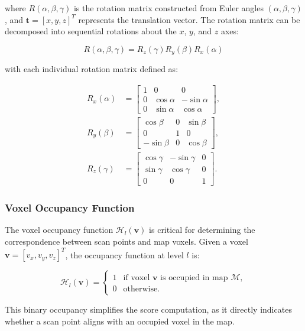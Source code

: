 where $R(\alpha, \beta, \gamma)$ is the rotation matrix constructed from Euler angles $(\alpha, \beta, \gamma)$, and $\mathbf{t} = [x, y, z]^T$ represents the translation vector. The rotation matrix can be decomposed into sequential rotations about the $x$, $y$, and $z$ axes:

$$R(\alpha, \beta, \gamma) = R_z(\gamma) R_y(\beta) R_x(\alpha)$$

with each individual rotation matrix defined as:

\begin{align}
R_x(\alpha) &= \begin{bmatrix}
1 & 0 & 0 \\
0 & \cos\alpha & -\sin\alpha \\
0 & \sin\alpha & \cos\alpha
\end{bmatrix}, \\
R_y(\beta) &= \begin{bmatrix}
\cos\beta & 0 & \sin\beta \\
0 & 1 & 0 \\
-\sin\beta & 0 & \cos\beta
\end{bmatrix}, \\
R_z(\gamma) &= \begin{bmatrix}
\cos\gamma & -\sin\gamma & 0 \\
\sin\gamma & \cos\gamma & 0 \\
0 & 0 & 1
\end{bmatrix}.
\end{align}

\subsubsection{Voxel Occupancy Function}
The voxel occupancy function $\mathcal{H}_l(\mathbf{v})$ is critical for determining the correspondence between scan points and map voxels. Given a voxel $\mathbf{v} = [v_x, v_y, v_z]^T$, the occupancy function at level $l$ is:

\begin{equation*}
\mathcal{H}_l(\mathbf{v}) = 
\begin{cases}
1 & \text{if voxel } \mathbf{v} \text{ is occupied in map } \mathcal{M}, \\
0 & \text{otherwise}.
\end{cases}
\end{equation*}

This binary occupancy simplifies the score computation, as it directly indicates whether a scan point aligns with an occupied voxel in the map.

